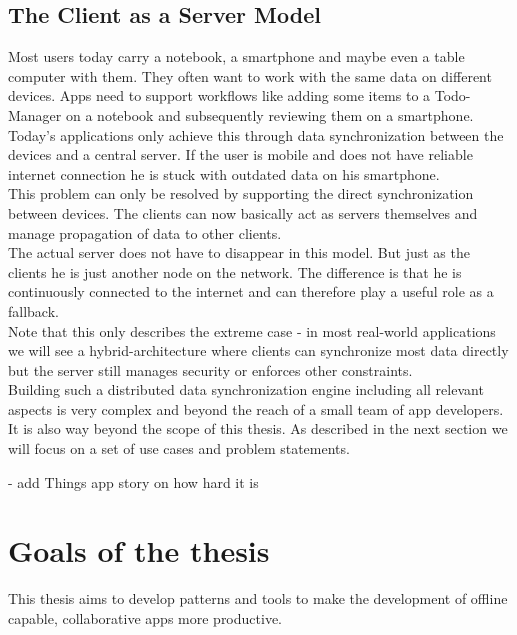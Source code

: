 \subsection{The Client as a Server Model}
Most users today carry a notebook, a smartphone and maybe even a table computer with them. They often want to work with the same data on different devices. Apps need to support workflows like adding some items to a Todo-Manager on a notebook and subsequently reviewing them on a smartphone. Today's applications only achieve this through  data synchronization between the devices and a central server. If the user is mobile and does not have reliable internet connection he is stuck with outdated data on his smartphone.\\
This problem can only be resolved by supporting the direct synchronization between devices. The clients can now basically act as servers themselves and manage propagation of data to other clients.\\
The actual server does not have to disappear in this model. But just as the clients he is just another node on the network. The difference is that he is continuously connected to the internet and can therefore play a useful role as a fallback.\\
Note that this only describes the extreme case - in most real-world applications we will see a hybrid-architecture where clients can synchronize most data directly but the server still manages security or enforces other constraints.\\
Building such a distributed data synchronization engine including all relevant aspects is very complex and beyond the reach of a small team of app developers. It is also way beyond the scope of this thesis. As described in the next section we will focus on a set of use cases and problem statements.

- add Things app story on how hard it is

\section{Goals of the thesis}
This thesis aims to develop patterns and tools to make the development of offline capable, collaborative apps more productive.\\

